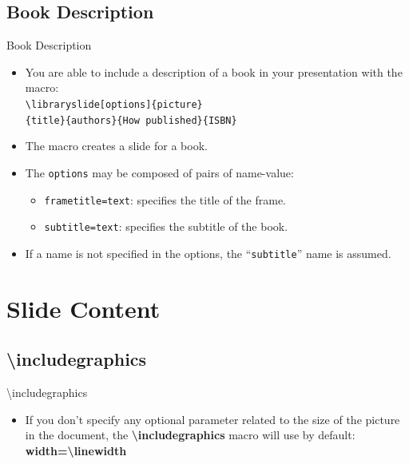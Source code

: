 \documentclass[english,sectioncirclenumberstyle]{ciadbeamer}
\begin{document}
\subsection{Book Description}

\begin{frame}{Book Description}
	\begin{itemize}
	\item You are able to include a description of a book in your presentation with the macro: \\
		\texttt{{\textbackslash}libraryslide[options]\{picture\}} \\
		\texttt{\{title\}\{authors\}\{How published\}\{ISBN\}}
	\vspace{1em}
	\item The macro creates a slide for a book.
	\vspace{1em}
	\item The \texttt{options} may be composed of pairs of name-value:
		\begin{itemize}
		\item \texttt{frametitle=text}: specifies the title of the frame.
		\item \texttt{subtitle=text}: specifies the subtitle of the book.
		\end{itemize}
	\item If a name is not specified in the options, the ``\texttt{subtitle}'' name is assumed.
	\end{itemize}
\end{frame}

\section{Slide Content}
\tableofcontentslide[sectionstyle={show/shaded},subsectionstyle={show/show/hide},subsubsectionstyle={hide/hide/hide/hide},sections={3-}]

\subsection{{\textbackslash}includegraphics}
\tableofcontentslide[sectionstyle={show/shaded},subsectionstyle={show/shaded/hide},subsubsectionstyle={hide/hide/hide/hide},sections={3-}]

\begin{frame}{{\textbackslash}includegraphics}
	\begin{itemize}
	\vspace{2em}
	\item If you don't specify any optional parameter related to the size of the picture in the document, the \textbf{{\textbackslash}includegraphics} macro will use by default: \\
		\textbf{width={\textbackslash}linewidth}
	\end{itemize}
\end{frame}
\end{document}
